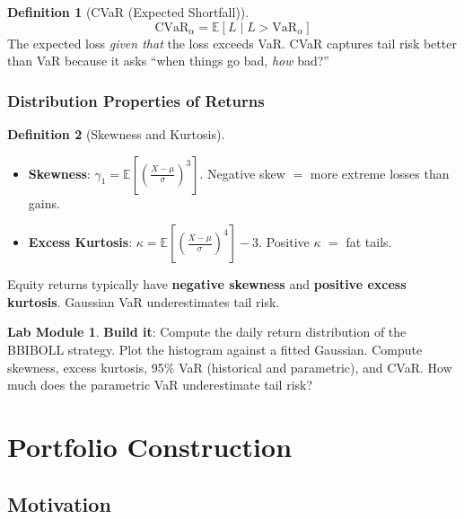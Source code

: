 \documentclass[a4paper, 11pt]{report}
\theoremstyle{definition}
\newtheorem{definition}{Definition}[chapter]
\newtheorem{labmod}{Lab Module}[chapter]
\theoremstyle{remark}
\begin{document}
\begin{definition}[CVaR (Expected Shortfall)]
    \[
        \text{CVaR}_\alpha = \mathbb{E}[L \mid L > \text{VaR}_\alpha]
    \]
    The expected loss \emph{given that} the loss exceeds VaR\@.  CVaR captures
    tail risk better than VaR because it asks ``when things go bad, \emph{how}
    bad?''
\end{definition}

\subsection{Distribution Properties of Returns}

\begin{definition}[Skewness and Kurtosis]
    \begin{itemize}
        \item \textbf{Skewness}: $\gamma_1 = \mathbb{E}\!\left[\left(\frac{X-\mu}{\sigma}\right)^{\!3}\right]$.
              Negative skew $=$ more extreme losses than gains.
        \item \textbf{Excess Kurtosis}: $\kappa = \mathbb{E}\!\left[\left(\frac{X-\mu}{\sigma}\right)^{\!4}\right] - 3$.
              Positive $\kappa$ $=$ fat tails.
    \end{itemize}
    Equity returns typically have \textbf{negative skewness} and \textbf{positive
    excess kurtosis}.  Gaussian VaR underestimates tail risk.
\end{definition}

\begin{labmod}
    \textbf{Build it}: Compute the daily return distribution of the BBIBOLL
    strategy.  Plot the histogram against a fitted Gaussian.  Compute skewness,
    excess kurtosis, 95\% VaR (historical and parametric), and CVaR\@.  How much
    does the parametric VaR underestimate tail risk?
\end{labmod}


\chapter{Portfolio Construction}
\label{ch:portfolio}

\section{Motivation}
\end{document}
